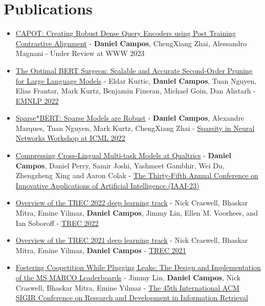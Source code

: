 \documentclass[draftthesis,tocnosub,noragright,centerchapter,fullpagesingle,12pt]{uiuc_csthesis21}
\theoremstyle{definition}
\numberwithin{algocf}{chapter}
\begin{document}
\section{Publications}
\begin{itemize}
\item \href{}{CAPOT: Creating Robust Dense Query Encoders using Post
Training Contrastive Alignment} - \textbf{Daniel Campos}, ChengXiang Zhai, Alessandro Magnani - Under Review at WWW 2023
\item \href{https://arxiv.org/abs/2203.07259}{The Optimal BERT Surgeon: Scalable and Accurate Second-Order Pruning for Large Language Models} - Eldar Kurtic, \textbf{Daniel Campos}, Tuan Nguyen, Elias Frantar, Mark Kurtz, Benjamin Fineran, Michael Goin, Dan Alistarh - \href{https://2022.emnlp.org/}{EMNLP 2022}
\item \href{https://arxiv.org/abs/2205.12452}{Sparse*BERT: Sparse Models are Robust} - \textbf{Daniel Campos}, Alexandre Marques, Tuan Nguyen, Mark Kurtz, ChengXiang Zhai - \href{https://www.sparseneural.net/}{Sparsity in Neural Networks Workshop at ICML 2022}
\item \href{}{Compressing Cross-Lingual Multi-task Models at Qualtrics} - \textbf{Daniel Campos}, Daniel Perry, Samir Joshi, Yashmeet Gambhir, Wei Du, Zhengzheng Xing and Aaron Colak - \href{https://aaai.org/Conferences/AAAI-23/iaai-23-call/}{The Thirty-Fifth Annual Conference on Innovative Applications of Artificial Intelligence (IAAI-23)}
\item \href{https://www.microsoft.com/en-us/research/uploads/prod/2022/05/trec2021-deeplearning-overview.pdf}{Overview of the TREC 2022 deep learning track} - Nick Craswell, Bhaskar Mitra, Emine Yilmaz, \textbf{Daniel Campos}, Jimmy Lin, Ellen M. Voorhees, and Ian Soboroff - \href{https://trec.nist.gov/tracks.html}{TREC 2022}
\item \href{https://www.microsoft.com/en-us/research/uploads/prod/2022/05/trec2021-deeplearning-overview.pdf}{Overview of the TREC 2021 deep learning track} - Nick Craswell, Bhaskar Mitra, Emine Yilmaz, \textbf{Daniel Campos} - \href{https://trec.nist.gov/tracks.html}{TREC 2021}
\item \href{https://www.microsoft.com/en-us/research/publication/fostering-coopetition-while-plugging-leaks-the-design-and-implementation-of-the-ms-marco-leaderboards/}{Fostering Coopetition While Plugging Leaks: The Design and Implementation of the MS MARCO Leaderboards} - Jimmy Lin, \textbf{Daniel Campos}, Nick Craswell, Bhaskar Mitra, Emine Yilmaz - \href{https://sigir.org/sigir2022/} {The 45th International ACM SIGIR Conference on Research and Development in Information Retrieval}
\end{itemize}
\end{document}
